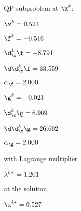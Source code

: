 QP subproblem at $\x^{k}$:

\bigskip
$\x^k=   0.524$


$\f^k =  -0.516$

$\d^k_{\x} \f =  -8.791$

$\d\d^k_{\x} \tilde \f =  33.559$

$\alpha_{\footnotesize\f} =   2.000$

\bigskip
$\g^k =  -0.023$

$\d^k_{\x}\g =   6.969$

$\d\d^k_{\x} \tilde \g =  26.602$

$\alpha_{\footnotesize\g} =   2.000$

\bigskip
with Lagrange multiplier

$\lambda^{k\star} =   1.201$

at the solution

$\x^{k\star} =   0.527$

